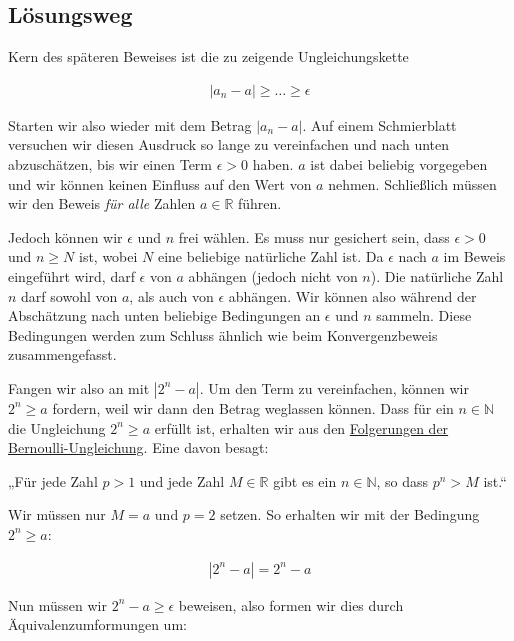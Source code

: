 \documentclass[fontsize=9pt,
               parskip=half-,
               DIV=14,
               listof=chapterentry,
               tocflat]{scrbook}
\begin{document}
\subsection{Lösungsweg}

Kern des späteren Beweises ist die zu zeigende Ungleichungskette

\begin{align*}
|a_{n}-a|\geq \ldots \geq \epsilon 
\end{align*}

Starten wir also wieder mit dem Betrag $|a_{n}-a|$. Auf einem Schmierblatt versuchen wir diesen Ausdruck so lange zu vereinfachen und nach unten abzuschätzen, bis wir einen Term $\epsilon >0$ haben. $a$ ist dabei beliebig vorgegeben und wir können keinen Einfluss auf den Wert von $a$ nehmen. Schließlich müssen wir den Beweis \emph{für alle} Zahlen $a\in \mathbb {R} $ führen.

Jedoch können wir $\epsilon $ und $n$ frei wählen. Es muss nur gesichert sein, dass $\epsilon >0$ und $n\geq N$ ist, wobei $N$ eine beliebige natürliche Zahl ist. Da $\epsilon $ nach $a$ im Beweis eingeführt wird, darf $\epsilon $ von $a$ abhängen (jedoch nicht von $n$). Die natürliche Zahl $n$ darf sowohl von $a$, als auch von $\epsilon $ abhängen. Wir können also während der Abschätzung nach unten beliebige Bedingungen an $\epsilon $ und $n$ sammeln. Diese Bedingungen werden zum Schluss ähnlich wie beim Konvergenzbeweis zusammengefasst.

Fangen wir also an mit $|2^{n}-a|$. Um den Term zu vereinfachen, können wir $2^{n}\geq a$ fordern, weil wir dann den Betrag weglassen können. Dass für ein $n\in \mathbb {N} $ die Ungleichung $2^{n}\geq a$ erfüllt ist, erhalten wir aus den \href{https://de.wikibooks.org/wiki/Mathe\_für\_Nicht-Freaks:\_Bernoulli-Ungleichung\#Anker:Folgerung}
{Folgerungen der Bernoulli-Ungleichung}. Eine davon besagt:

\begin{importantparagraph*}
„Für jede Zahl $p>1$ und jede Zahl $M\in \mathbb {R} $ gibt es ein $n\in \mathbb {N} $, so dass $p^{n}>M$ ist.“

\end{importantparagraph*}

Wir müssen nur $M=a$ und $p=2$ setzen. So erhalten wir mit der Bedingung $2^{n}\geq a$:

\begin{align*}
|2^{n}-a|=2^{n}-a
\end{align*}

Nun müssen wir $2^{n}-a\geq \epsilon $ beweisen, also formen wir dies durch Äquivalenzumformungen um:
\end{document}

